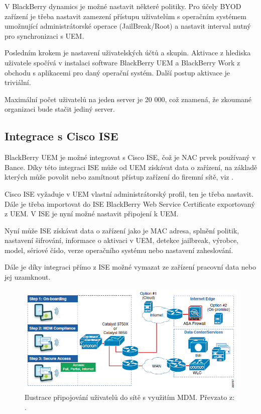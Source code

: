V BlackBerry dynamics je možné nastavit některé politiky. Pro účely BYOD zařízení je třeba nastavit zamezení přístupu uživatelům s operačním systémem umožnující administrátorské operace (JailBreak/Root) a nastavit interval nutný pro synchronizaci s UEM.

Posledním krokem je nastavení uživatelských účtů a skupin. Aktivace z hlediska uživatele spočívá v instalaci software BlackBerry UEM a BlackBerry Work z obchodu s aplikacemi pro daný operační systém. Další postup aktivace je triviální.

Maximální počet uživatelů na jeden server je 20 000, což znamená, že zkoumané organizaci bude stačit jediný server. 

\subsection{Integrace s Cisco ISE}

BlackBerry UEM je možné integrovat s Cisco ISE, čož je NAC prvek používaný v Bance. Díky této integraci ISE může od UEM získávat data o zařízení, na základě kterých může povolit nebo zamítnout přístup zařízení do firemní sítě, viz \cite{CiscoDesign}.

Cisco ISE vyžaduje v UEM vlastní administrátorský profil, ten je třeba nastavit. Dále je třeba importovat do ISE BlackBerry Web Service Certificate exportovaný z UEM. V ISE je nyní možné nastavit připojení k UEM. 

Nyní může ISE získávat data o zařízení jako je MAC adresa, splnění politik, nastavení šifrování, informace o aktivaci v UEM, detekce jailbreak, výrobce, model, sériové číslo, verze operačního systému nebo nastavení zaheslování.

Dále je díky integraci přímo z ISE možné vymazat ze zařízení pracovní data nebo jej uzamknout.

\begin{figure}[h!]
\centering
\includegraphics[width=13cm]{img/CiscoMDM}
\caption{Ilustrace připojování uživatelů do sítě s využitím MDM. Převzato z: \cite{CiscoDesign}\label{CiscoMDM}.}
\end{figure}


